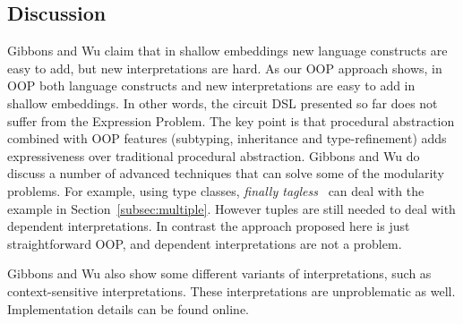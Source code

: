 \subsection{Discussion}
Gibbons and Wu claim that in shallow
embeddings new language constructs are easy to add, but new
interpretations are hard. As our OOP approach shows, in OOP both
language constructs and new interpretations are easy to add in shallow
embeddings. In other words, the circuit DSL presented so far does not
suffer from the Expression Problem. The key point is that procedural
abstraction combined with OOP features (subtyping, inheritance and
type-refinement) adds expressiveness over traditional procedural
abstraction. Gibbons and Wu do discuss a number of advanced techniques that 
can solve some of the modularity problems. For example, using type
classes, \emph{finally
  tagless}~\cite{carette2009finally} can deal with the example in
Section~\ref{subsec:multiple}. However
tuples are still needed 
to deal with dependent interpretations. In contrast the approach
proposed here is just straightforward OOP, and dependent
interpretations are not a problem.
\begin{comment}
and \emph{data types a la
  carte}~\cite{swierstra2008data} (DTC).
Finally tagless approach uses a type class to abstract over all interpretations
of the language. Concrete interpretations are given through creating a data type and
making it an instance of that type. However, it forces dependent interpretations to be defined along with what they depend on.
DTC represents language constructs separately and composes them together using
extensible sums. However, not like OO languages which come with subtyping, one
has to manually implement the subtyping machinery for variants.
\end{comment}
Gibbons and Wu also show some different variants of interpretations,
such as context-sensitive interpretations. 
These interpretations are unproblematic as well.
Implementation details can be found online.

\begin{comment}
Unlike \lstinline{width} and \lstinline{wellSized} which can be defined with
only the given circuit, context-dependent interpretations may need some context.
These contexts can be captured by arguments of the method. For example, a
function that collects all the connections between wires inside a circuit would have
the following signature:
\begin{lstlisting}
type Layout = List[List[Tuple2[Int,Int]]]
def tlayout(f: Int => Int): Layout
\end{lstlisting}
where the context \lstinline{f} may vary in recursive
calls. Context-sensitive transformations do not pose any particular
challenge. For space reasons, we omit the implementation details here. Full details
are available online.
\end{comment}